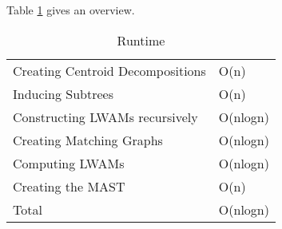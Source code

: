 Table \ref{spaceTable} gives an overview.
\begin{table}[]
	\centering
	\begin{tabular}{l|l}
		Creating Centroid Decompositions & O(n)     \\
		Inducing Subtrees                & O(n)     \\
		Constructing LWAMs recursively	 & O(nlogn) \\
		Creating Matching Graphs         & O(nlogn) \\
		Computing LWAMs                  & O(nlogn) \\
		Creating the MAST                & O(n)     \\ \hline
		Total                            & O(nlogn)
	\end{tabular}
	\caption{Runtime}
	\label{spaceTable}
\end{table}





